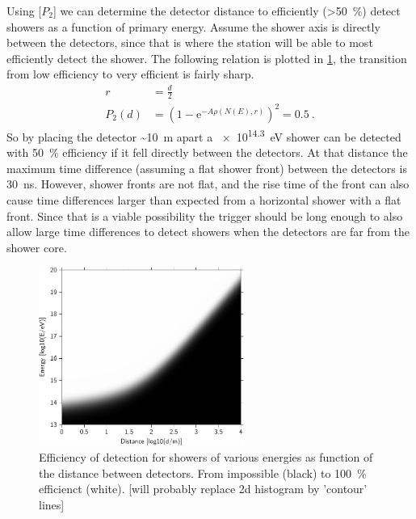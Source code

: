 Using [$P_2$] we can determine the detector distance to efficiently (\SI{>50}{\percent}) detect showers as a function of primary energy. Assume the shower axis is directly between the detectors, since that is where the station will be able to most efficiently detect the shower. The following relation is plotted in \cref{fig:efficiency_distance_energy}, the transition from low efficiency to very efficient is fairly sharp.
%
\begin{equation}
\begin{split}
    r &= \frac{d}{2} \\
    P_2(d) &= \left(1 - \mathrm{e}^{-A \rho(N(E), r)} \right)^2 = 0.5 \ .
\end{split}
\end{equation}
%
So by placing the detector \SI{~10}{\meter} apart a \SI{e14.3}{\eV} shower can be detected with \SI{50}{\percent} efficiency if it fell directly between the detectors. At that distance the maximum time difference (assuming a flat shower front) between the detectors is \SI{30}{\ns}. However, shower fronts are not flat, and the rise time of the front can also cause time differences larger than expected from a horizontal shower with a flat front. Since that is a viable possibility the trigger should be long enough to also allow large time differences to detect showers when the detectors are far from the shower core.

\begin{figure}
    \centering
    \includegraphics[width=0.6\textwidth]
                    {plots/experiment/efficiency_distance_energy}
    \caption{Efficiency of detection for showers of various energies as function of the distance between detectors. From impossible (black) to \SI{100}{\percent} efficienct (white). [will probably replace 2d histogram by 'contour' lines]}
    \label{fig:efficiency_distance_energy}
\end{figure}


